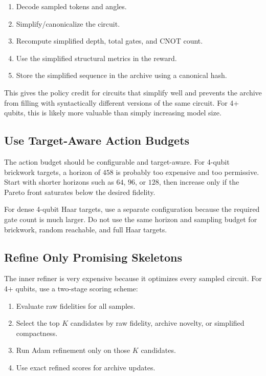 \documentclass[11pt]{article}
\begin{document}
\begin{enumerate}[leftmargin=*]
  \item Decode sampled tokens and angles.
  \item Simplify/canonicalize the circuit.
  \item Recompute simplified depth, total gates, and CNOT count.
  \item Use the simplified structural metrics in the reward.
  \item Store the simplified sequence in the archive using a canonical hash.
\end{enumerate}

This gives the policy credit for circuits that simplify well and prevents the
archive from filling with syntactically different versions of the same circuit.
For 4+ qubits, this is likely more valuable than simply increasing model size.

\subsection{Use Target-Aware Action Budgets}

The action budget should be configurable and target-aware.  For 4-qubit
brickwork targets, a horizon of \(458\) is probably too expensive and too
permissive.  Start with shorter horizons such as \(64\), \(96\), or \(128\),
then increase only if the Pareto front saturates below the desired fidelity.

For dense 4-qubit Haar targets, use a separate configuration because the required
gate count is much larger.  Do not use the same horizon and sampling budget for
brickwork, random reachable, and full Haar targets.

\subsection{Refine Only Promising Skeletons}

The inner refiner is very expensive because it optimizes every sampled circuit.
For 4+ qubits, use a two-stage scoring scheme:

\begin{enumerate}[leftmargin=*]
  \item Evaluate raw fidelities for all samples.
  \item Select the top \(K\) candidates by raw fidelity, archive novelty, or
  simplified compactness.
  \item Run Adam refinement only on those \(K\) candidates.
  \item Use exact refined scores for archive updates.
\end{enumerate}
\end{document}
